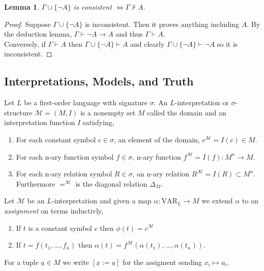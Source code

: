 \documentclass[12pt]{article}
\newcommand{\proves}{\vdash}
\newcommand{\Mmod}{\mathcal{M}}
\newcommand{\ul}[1]{\underline{#1}}
\newcommand{\VAR}[1]{\mathrm{VAR}_{#1}}
\newenvironment{definition}[1][Definition:]{\begin{trivlist}
\item[\hskip \labelsep {\bfseries #1}]}{\end{trivlist}}
\theoremstyle{theorem}
\newtheorem{lemma}[theorem]{Lemma}
\theoremstyle{definition}
\theoremstyle{definition}
\theoremstyle{remark}
\theoremstyle{definition}
\theoremstyle{remark}
\begin{document}
\begin{lemma}
$\Gamma \cup \{ \neg A \}$ is consistent $\iff \Gamma \not\proves A$.
\end{lemma}

\begin{proof}
Suppose $\Gamma \cup \{ \neg A \}$ is inconsistent. Then it proves anything including $A$. By the deduction lemma, $\Gamma \proves \neg A \to A$ and thus $\Gamma \proves A$.
\bigskip\\
Conversely,
if $\Gamma \proves A$ then $\Gamma \cup \{ \neg A \} \proves A$ and clearly $\Gamma \cup \{ \neg A \} \proves \neg A$ so it is inconsistent. 
\end{proof}

\subsection{Interpretations, Models, and Truth}

\begin{definition}
Let $L$ be a first-order language with signature $\sigma$. An $L$-interpretation or $\sigma$-structure $\Mmod = (M, I)$ is a nonempty set $M$ called the domain and an interpretation function $I$ satisfying,
\begin{enumerate}
\item For each constant symbol $c \in \sigma$, an element of the domain, $c^{\Mmod} = I(c) \in M$.
\item For each n-ary function symbol $f \in \sigma$, n-ary function $f^{\Mmod} = I(f) : M^n \to M$.
\item For each n-ary relation symbol $R \in \sigma$, an n-ary relation $R^{\Mmod} = I(R) \subset M^n$. Furthermore $=^{\Mmod}$ is the diagonal relation $\Delta_M$.
\end{enumerate}
\end{definition}

\begin{definition}
Let $\Mmod$ be an $L$-interpretation and given a map $\alpha : \VAR{L} \to M$ we extend $\alpha$ to an \textit{assignment} on terms inductivly,
\begin{enumerate}
\item If $t$ is a constant symbol $c$ then $\phi(t) = c^{\Mmod}$
\item If $t = f(t_1, \dots, f_n)$ then $\alpha(t) = f^{\Mmod}(\alpha(t_1), \dots, \alpha(t_n))$.  
\end{enumerate} 
For a tuple $\ul{a} \in M$ we write $[\ul{x} := \ul{a}]$ for the assigment sending $x_i \mapsto a_i$.
\end{definition}
\end{document}

